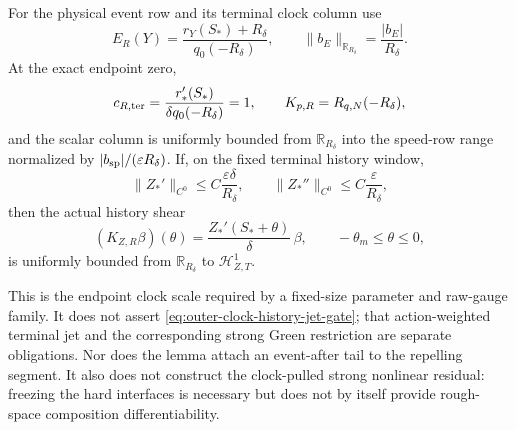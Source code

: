 \begin{lemma}
For the physical event row and its terminal clock column use
\begin{equation}
 E_R(Y)=\frac{r_Y(S_*)+R_\delta}{q_0(-R_\delta)},
 \qquad \|b_E\|_{\mathbb R_{R_\delta}}=\frac{|b_E|}{R_\delta}.
                                                        \label{eq:outer-clock-event-row}
\end{equation}
At the exact endpoint zero,
\begin{equation}
 c_{R,\rm ter}
 =\frac{r_*'(S_*)}{\delta q_0(-R_\delta)}=1,
 \qquad
 K_{p,R}=R_{q,N}(-R_\delta),                    \label{eq:outer-clock-scalar-column}
\end{equation}
and the scalar column is uniformly bounded from
\(\mathbb R_{R_\delta}\) into the speed-row range normalized by
\(|b_{\rm sp}|/(\varepsilon R_\delta)\).
If, on the fixed terminal history window,
\begin{equation}
 \|Z_*'\|_{C^0}\le C\frac{\varepsilon\delta}{R_\delta},
 \qquad
 \|Z_*''\|_{C^0}\le C\frac{\varepsilon}{R_\delta},          \label{eq:outer-clock-history-jet-gate}
\end{equation}
then the actual history shear
\begin{equation}
 (K_{Z,R}\beta)(\theta)
 =\frac{Z_*'(S_*+\theta)}\delta\,\beta,
 \qquad-\theta_m\le\theta\le0,                 \label{eq:outer-clock-history-column}
\end{equation}
is uniformly bounded from \(\mathbb R_{R_\delta}\) to
\(\mathcal H_{Z,T}^1\).

This is the endpoint clock scale required by a fixed-size parameter and
raw-gauge family.  It does not assert
\cref{eq:outer-clock-history-jet-gate}; that action-weighted terminal jet
and the corresponding strong Green restriction are separate obligations.
Nor does the lemma attach an event-after tail to the repelling segment.
It also does not construct the clock-pulled strong nonlinear residual:
freezing the hard interfaces is necessary but does not by itself provide
rough-space composition differentiability.
\end{lemma}

